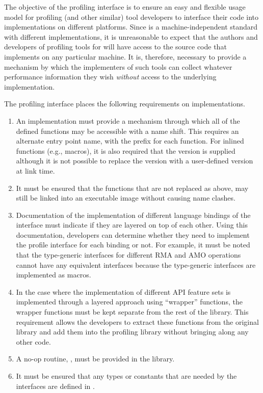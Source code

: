 The objective of the \openshmem profiling interface is to ensure an
easy and flexible usage model for profiling (and other similar)
tool developers to interface their code into \openshmem
implementations on different platforms. Since \openshmem is a
machine-independent standard with different implementations, it is
unreasonable to expect that the authors and developers of profiling
tools for \openshmem will have access to the source code that
implements \openshmem on any particular machine. It is, therefore,
necessary to provide a mechanism by which the implementers of such
tools can collect whatever performance information they wish
\emph{without} access to the underlying implementation.

The \openshmem profiling interface places the following requirements
on implementations.

\begin{enumerate}
\item An \openshmem implementation must provide a mechanism through
which all of the \openshmem defined functions may be accessible
with a name shift. This requires an alternate
entry point name, with the prefix  for each
\openshmem function. For \openshmem inlined functions (e.g., macros),
it is also required that the  version is supplied
although it is not possible to replace the  version
with a user-defined version at link time.
\item It must be ensured that the \openshmem functions that are not
replaced as above, may still be linked into an executable image
without causing name clashes.
\item Documentation of the implementation of different language
bindings of the \openshmem interface must indicate if they
are layered on top of each other. Using this documentation,
developers can determine whether they need to implement the
profile interface for each binding or not. For example, it must
be noted that the \openshmem \Cstd[11] type-generic interfaces for
different \ac{RMA} and \ac{AMO} operations cannot have any equivalent
 interfaces because the \Cstd[11] type-generic
interfaces are implemented as macros.
\item In the case where the implementation of different \ac{API}
feature sets is implemented through a layered approach using
``wrapper'' functions, the wrapper functions must be kept separate
from the rest of the library. This requirement allows the developers
to extract these functions from the original \openshmem library
and add them into the profiling library without bringing along any
other code.
\item A no-op routine, , must be provided
in the \openshmem library.
\item It must be ensured that any \openshmem types or constants that are
needed by the  interfaces are defined in .
\end{enumerate}

